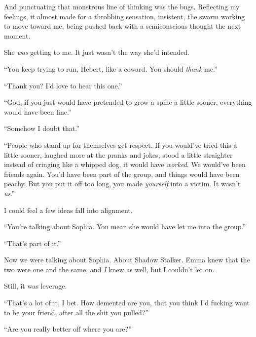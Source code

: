 And punctuating that monstrous line of thinking was the bugs.  Reflecting my feelings, it almost made for a throbbing sensation, insistent, the swarm working to move toward me, being pushed back with a semiconscious thought the next moment.



She \emph{was} getting to me.  It just wasn't the way she'd intended.



``You keep trying to run, Hebert, like a coward.  You should \emph{thank }me.''



``Thank you?  I'd love to hear this one.''



``God, if you just would have pretended to grow a spine a little sooner, everything would have been fine.''



``Somehow I doubt that.''



``People who stand up for themselves get respect.  If you would've tried this a little sooner, laughed more at the pranks and jokes, stood a little straighter instead of cringing like a whipped dog, it would have \emph{worked}.  We would've been friends again.  You'd have been part of the group, and things would have been peachy.  But you put it off too long, you made \emph{yourself }into a victim.  It wasn't \emph{us}.''



I could feel a few ideas fall into alignment.



``You're talking about Sophia.  You mean she would have let me into the group.''



``That's part of it.''



Now we were talking about Sophia.  About Shadow Stalker.  Emma knew that the two were one and the same, and \emph{I} knew as well, but I couldn't let on.



Still, it was leverage.



``That's a lot of it, I bet.  How demented are you, that you think I'd fucking want to be your friend, after all the shit you pulled?''



``Are you really better off where you are?''




